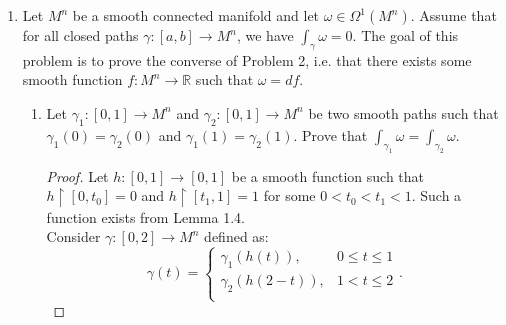 \documentclass{article}
\begin{document}
\begin{enumerate}[label={\bf Q\arabic*:}]
\begin{enumerate}
      \item Define $M^2_2=\{(x,y)|x>0\}$. Construct an explicit function
        $f:M^2_2\rightarrow\mathbb{R}$ such that $\omega=df$.
        \begin{proof}
          Consider $f((x,y))=\arctan{\frac{y}{x}}$. Then
          \begin{align*}
            df &=\frac{\partial f}{\partial x}dx + \frac{\partial
              f}{\partial y}dy \\
              &=\left(\frac{-y}{x^2+y^2}\right)dx
                +\left(\frac{x}{x^2+y^2}\right)dy \\
              &=\omega. \\
          \end{align*}
        \end{proof}
    \end{enumerate}

  \item Let $M^n$ be a smooth connected manifold and let
    $\omega\in\Omega^1(M^n)$. Assume that for all closed paths
    $\gamma:[a,b]\rightarrow M^n$, we have $\int_\gamma\omega=0$. The goal
    of this problem is to prove the converse of Problem 2, i.e. that there
    exists some smooth function $f:M^n\rightarrow\mathbb{R}$ such that
    $\omega=df$.

    \begin{enumerate}
      \item Let $\gamma_1:[0,1]\rightarrow M^n$ and
        $\gamma_2:[0,1]\rightarrow M^n$ be two smooth paths such that
        $\gamma_1(0)=\gamma_2(0)$ and $\gamma_1(1)=\gamma_2(1)$. Prove that
        $\int_{\gamma_1}\omega=\int_{\gamma_2}\omega$.

        \begin{proof}
          Let $h:[0,1]\rightarrow[0,1]$ be a smooth function such that
          $h\restriction[0,t_0]=0$ and $h\restriction[t_1,1]=1$ for some
          $0<t_0<t_1<1$. Such a function exists from Lemma 1.4. \\

          Consider $\gamma:[0,2]\rightarrow M^n$ defined as:
          \begin{equation*}
            \gamma(t) =
            \begin{cases}
              \gamma_1(h(t)), &0\leq t\leq1 \\
              \gamma_2(h(2-t)), &1<t\leq2 \\
            \end{cases}.
          \end{equation*}


\end{proof}
\end{enumerate}
\end{enumerate}
\end{document}
